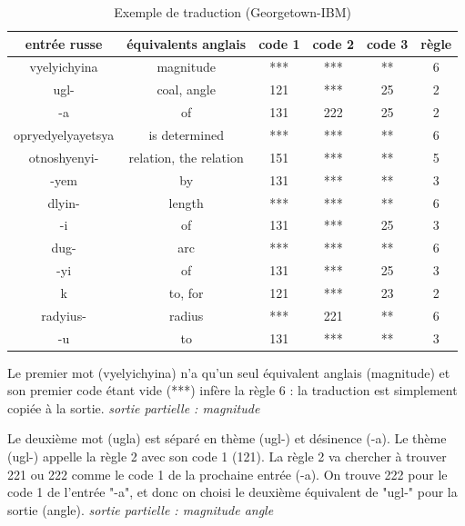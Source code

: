 \documentclass[11pt, a4paper]{report}
\begin{document}
\begin{table}[h] %
  \centering %
  \begin{tabular}{|c|c|c|c|c|c|} %
    \hline %
    entrée russe & équivalents anglais & code 1 & code 2 & code 3 & règle \\ %
    \hline
    vyelyichyina & magnitude & *** & *** & ** & 6 \\
    \hline
    ugl- & coal, angle & 121 & *** & 25 & 2 \\
    \hline 
    -a & of & 131 & 222 & 25 & 2 \\
    \hline 
    opryedyelyayetsya & is determined & *** & *** & ** & 6 \\
    \hline 
    otnoshyenyi- & relation, the relation & 151 & *** & ** & 5 \\ 
    \hline 
    -yem & by & 131 & *** & ** & 3 \\ 
    \hline 
    dlyin- & length & *** & *** & ** & 6 \\ 
    \hline 
    -i & of & 131 & *** & 25 & 3 \\ 
    \hline 
    dug- & arc & *** & *** & ** & 6 \\
    \hline 
    -yi & of & 131 & *** & 25 & 3 \\ 
    \hline 
    k & to, for & 121 & *** & 23 & 2 \\ 
    \hline 
    radyius- & radius & *** & 221 & ** & 6 \\ 
    \hline 
    -u & to & 131 & *** & ** & 3 \\
    \hline
  \end{tabular}
  \caption{Exemple de traduction (Georgetown-IBM)} %
  \label{tab:example} %
\end{table}

Le premier mot (vyelyichyina) n'a qu'un seul équivalent anglais (magnitude) et son 
premier code étant vide (***) infère la règle 6 : la traduction est simplement copiée 
à la sortie. \newline 
\textit{sortie partielle : magnitude} 

Le deuxième mot (ugla) est séparé en thème (ugl-) et désinence (-a). 
Le thème (ugl-) appelle la règle 2 avec son code 1 (121). La règle 2 va chercher à trouver 221 ou 222 
comme le code 1 de la prochaine entrée (-a). On trouve 222 pour le code 1 de l'entrée 
"-a", et donc on choisi le deuxième équivalent de "ugl-" pour la sortie (angle). \newline 
\textit{sortie partielle : magnitude angle}
\end{document}
